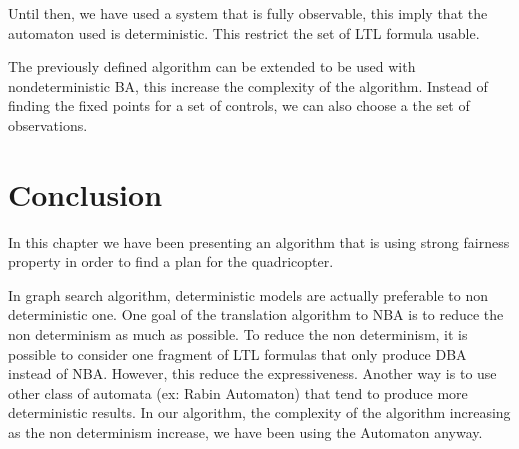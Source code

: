 Until then, we have used a system that is fully observable, this imply that the \buchi{} automaton used is deterministic.
This restrict the set of LTL formula usable. 

The previously defined algorithm can be extended to be used with nondeterministic BA, this increase the complexity of the algorithm. 
Instead of finding the fixed points for a set of controls, we can also choose a the set of observations.


\section{Conclusion}
In this chapter we have been presenting an algorithm that is using strong fairness property in order to find a plan for the quadricopter.



In graph search algorithm, deterministic models are actually preferable to non deterministic one. One goal of the translation algorithm to NBA is to reduce the non determinism as much as possible. 
To reduce the non determinism, it is possible to consider one fragment of LTL formulas that only produce DBA instead of NBA.
However, this reduce the expressiveness. Another way is to use other class of automata (ex: Rabin Automaton) that tend to produce more deterministic results.
In our algorithm, the complexity of the algorithm increasing as the non determinism increase, we have been using the \buchi{} Automaton anyway.